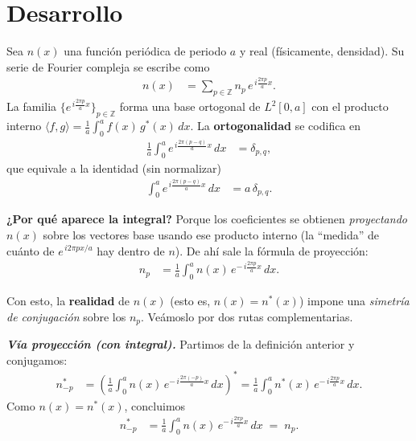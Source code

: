 \documentclass{article}
\begin{document}
\section{Desarrollo}


Sea $n(x)$ una función periódica de periodo $a$ y real (físicamente, densidad). Su serie de Fourier compleja se escribe como
\begin{equation*}
\begin{split}
n(x) &= \sum_{p\in\mathbb{Z}} n_{p}\,e^{\,i \tfrac{2\pi p}{a}x}.
\end{split}
\end{equation*}
La familia $\{e^{\,i \tfrac{2\pi p}{a}x}\}_{p\in\mathbb{Z}}$ forma una base ortogonal de $L^{2}[0,a]$ con el producto interno
$\langle f,g\rangle = \tfrac{1}{a}\!\int_{0}^{a} f(x)\,g^{*}(x)\,dx$. La \textbf{ortogonalidad} se codifica en
\begin{equation*}
\begin{split}
\frac{1}{a}\int_{0}^{a} e^{\,i \tfrac{2\pi (p-q)}{a}x}\,dx &= \delta_{p,q},
\end{split}
\end{equation*}
que equivale a la identidad (sin normalizar)
\begin{equation*}
\begin{split}
\int_{0}^{a} e^{\,i \tfrac{2\pi (p-q)}{a}x}\,dx &= a\,\delta_{p,q}.
\end{split}
\end{equation*}

\textbf{¿Por qué aparece la integral?} Porque los coeficientes se obtienen \emph{proyectando} $n(x)$ sobre los vectores base usando ese producto interno (la “medida” de cuánto de $e^{\,i 2\pi p x/a}$ hay dentro de $n$). De ahí sale la fórmula de proyección:
\begin{equation*}
\begin{split}
n_p &= \frac{1}{a}\int_{0}^{a} n(x)\,e^{-\,i \tfrac{2\pi p}{a}x}\,dx.
\end{split}
\end{equation*}

Con esto, la \textbf{realidad} de $n(x)$ (esto es, $n(x)=n^{*}(x)$) impone una \emph{simetría de conjugación} sobre los $n_p$. Veámoslo por dos rutas complementarias.

\medskip
\textbf{\textit{Vía proyección (con integral).}} Partimos de la definición anterior y conjugamos:
\begin{equation*}
\begin{split}
n_{-p}^{*} &= \left(\frac{1}{a}\int_{0}^{a} n(x)\,e^{-\,i \tfrac{2\pi (-p)}{a}x}\,dx\right)^{\!*}
           = \frac{1}{a}\int_{0}^{a} n^{*}(x)\,e^{-\,i \tfrac{2\pi p}{a}x}\,dx.
\end{split}
\end{equation*}
Como $n(x)=n^{*}(x)$, concluimos
\begin{equation*}
\begin{split}
n_{-p}^{*} &= \frac{1}{a}\int_{0}^{a} n(x)\,e^{-\,i \tfrac{2\pi p}{a}x}\,dx \;=\; n_{p}.
\end{split}
\end{equation*}
\end{document}
